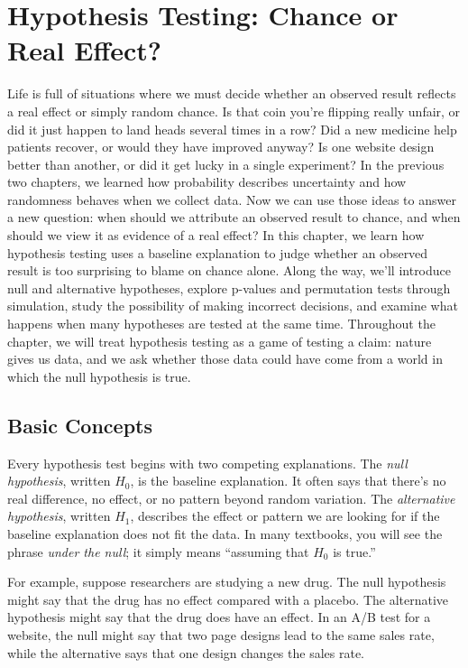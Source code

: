 \chapter{Hypothesis Testing: Chance or Real Effect?}
\label{ch:hypothesis}

Life is full of situations where we must decide whether an observed
result reflects a real effect or simply random chance. Is that coin
you're flipping really unfair, or did it just happen to land heads
several times in a row? Did a new medicine help patients recover, or
would they have improved anyway? Is one website design better than
another, or did it get lucky in a single experiment? In the previous
two chapters, we learned how probability describes uncertainty and how
randomness behaves when we collect data. Now we can use those ideas to
answer a new question: when should we attribute an observed result to
chance, and when should we view it as evidence of a real effect? In
this chapter, we learn how hypothesis testing uses a baseline
explanation to judge whether an observed result is too surprising to
blame on chance alone. Along the way, we'll introduce null and
alternative hypotheses, explore p-values and permutation tests through
simulation, study the possibility of making incorrect decisions, and
examine what happens when many hypotheses are tested at the same time.
Throughout the chapter, we will treat hypothesis testing as a game of
testing a claim: nature gives us data, and we ask whether those data
could have come from a world in which the null hypothesis is true.


\section{Basic Concepts}

Every hypothesis test begins with two competing explanations. The
\emph{null hypothesis}, written $H_0$,
is the baseline explanation. It often says that there's no real
difference, no effect, or no pattern beyond random variation. The
\emph{alternative hypothesis},
written $H_1$, describes the effect or pattern we are looking for if
the baseline explanation does not fit the data. In many textbooks, you
will see the phrase \emph{under the null}; it simply means ``assuming
that $H_0$ is true.''

For example, suppose researchers are studying a new drug. The null
hypothesis might say that the drug has no effect compared with a
placebo. The alternative hypothesis might say that the drug does have
an effect. In an A/B test for a website, the null might say that two
page designs lead to the same sales rate, while the alternative says
that one design changes the sales rate.

